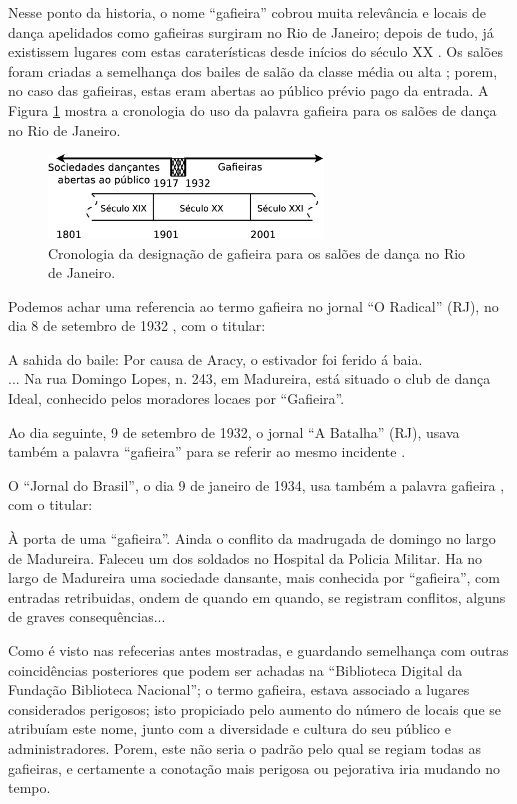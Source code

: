 Nesse ponto da historia, 
o nome ``gafieira'' cobrou muita relevância e locais de dança apelidados como gafieiras surgiram no Rio de Janeiro;
depois de tudo, já existissem lugares com estas caraterísticas desde inícios do século XX \cite[pp. 49]{diniz2003almanaque}.
Os salões foram criadas a semelhança dos bailes de salão da classe média ou alta \cite[pp. 78]{coutinho2006cronistas}; 
porem, no caso das gafieiras, estas eram abertas ao público prévio pago da entrada.
A Figura \ref{fig:gafieiracrono} mostra a cronologia do uso da palavra gafieira para os salões de dança no Rio de Janeiro.
\begin{figure}[h]
  \centering
    \includegraphics[width=0.65\textwidth]{chapters/cap-historia-gafieiras/gafieira-crono.eps}
  \caption{Cronologia da designação de gafieira para os salões de dança no Rio de Janeiro.}
  \label{fig:gafieiracrono}
\end{figure}


Podemos achar uma referencia ao termo gafieira no jornal ``O Radical'' (RJ),
no dia 8 de setembro de 1932 \cite[pp. 12]{gafieirajournaloradical1},
com o titular:
\begin{citando}%
A sahida do baile: Por causa de Aracy, o estivador foi ferido á baia.\\
... Na rua Domingo Lopes, n. 243, em Madureira, está situado o club de dança Ideal, 
conhecido pelos moradores locaes por ``Gafieira''.
\end{citando} 
Ao dia seguinte, 9 de setembro de 1932, o jornal ``A Batalha'' (RJ), 
usava também a palavra ``gafieira'' para se referir ao mesmo incidente \cite[pp. 8]{gafieirajournalabatalha1}.

O ``Jornal do Brasil'', o dia 9 de janeiro de 1934, 
usa também a palavra gafieira \cite[pp. 11]{gafieirajournalbrasil1}, com o titular:
\begin{citando}%
À porta de uma ``gafieira''.
Ainda o conflito da madrugada de domingo no largo de Madureira.
Faleceu um dos soldados no Hospital da Policia Militar. 
Ha no largo de Madureira uma sociedade dansante, mais conhecida por ``gafieira'', 
com entradas retribuidas, ondem de quando em quando, se registram conflitos, 
alguns de graves consequências...
\end{citando} 
Como é visto nas refecerias antes mostradas, e guardando semelhança com outras coincidências
posteriores que podem ser achadas na ``Biblioteca Digital da Fundação Biblioteca Nacional''; 
o termo gafieira, estava associado a lugares considerados perigosos;
isto propiciado pelo aumento do número de locais que se atribuíam este nome, junto com 
a diversidade e cultura  do seu público e administradores.
Porem, este não seria o padrão pelo qual se regiam todas as gafieiras, 
e certamente a conotação mais perigosa ou pejorativa iria mudando no tempo. 


